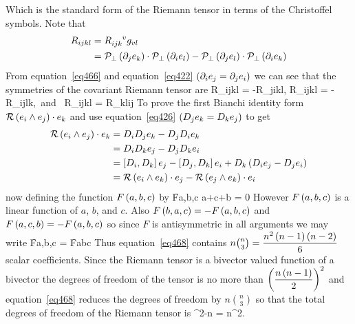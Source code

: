 Which is the standard form of the Riemann tensor in terms of the Christoffel symbols. Note that
\begin{align}
 R_{ijkl} &= R\indices{_{ijk}^{v}}g_{vl} \nonumber \\
          &= \Prjp{\partial_{j} e_{k}}\cdot \Prjp{\partial_{i} e_{l}}-\Prjp{\partial_{j} e_{l}}\cdot \Prjp{\partial_{i} e_{k}} \label{eq466}
\end{align}
From equation~\ref{eq466} and equation~\ref{eq422} $\left ( {\partial_{i}e_{j}=\partial_{j}e_{i}} \right )$ we can see that the symmetries of the covariant Riemann tensor are
\be 
R_{ijkl} = -R_{jikl},\:\: R_{ijkl} = -R_{ijlk},\mbox{ and } R_{ijkl} = R_{klij}\nonumber
\ee
To prove the first Bianchi identity form ${\mathcal{R}}\left ( {e_{i}\wedge e_{j}} \right )\cdot e_{k}$ and use equation~\ref{eq426} $\left ( {D_{j}e_{k}=D_{k}e_{j}} \right )$ to get
\begin{align}
{\mathcal{R}}\left ( {e_{i}\wedge e_{j}} \right )\cdot e_{k} &= D_{i}D_{j}e_{k}-D_{j}D_{i}e_{k} \nonumber \\
                                &= D_{i}D_{k}e_{j}-D_{j}D_{k}e_{i} \nonumber \\
                                &= \left [ {D_{i}},{D_{k}}\right ]e_{j}-\left [ {D_{j}},{D_{k}}\right ]e_{i}+D_{k}\left ( {D_{i}e_{j}-D_{j}e_{i}} \right ) \nonumber \\
                                &= {\mathcal{R}}\left ( {e_{i}\wedge e_{k}} \right )\cdot e_{j}-{\mathcal{R}}\left ( {e_{j}\wedge e_{k}} \right )\cdot e_{i}
\end{align}
now defining the function ${F}\left ( {a,b,c} \right )$ by
\be\label{eq468}
\f{F}{a,b,c} \equiv a\cdot{}+c\cdot{}+b\cdot{} = 0
\ee
However ${F}\left ( {a,b,c} \right )$ is a linear function of $a$, $b$, and $c$.  Also ${F}\left ( {b,a,c} \right ) = -{F}\left ( {a,b,c} \right )$ and
${F}\left ( {a,c,b} \right ) = -{F}\left ( {a,b,c} \right )$ so since $F$ is antisymmetric in all arguments we may write
\be\label{eq469}
\f{F}{a,b,c} = \f{F}{a\W b\W c}
\ee 
Thus equation~\ref{eq468} contains $n\binom{n}{3} = \displaystyle\frac{n^{2}\left ( {n-1} \right )\left ( {n-2} \right )}{6}$ scalar coefficients. Since the
Riemann tensor is a bivector valued function of a bivector the degrees of freedom of the tensor is no more than
$\left ( {\displaystyle\frac{n\left ( {n-1} \right )}{2}} \right )^{2}$ and equation~\ref{eq468} reduces the degrees of freedom by $n\binom{n}{3}$ so that
the total degrees of freedom of the Riemann tensor is
\be\nonumber
{}^{2}-n = n^{2}.
\ee


